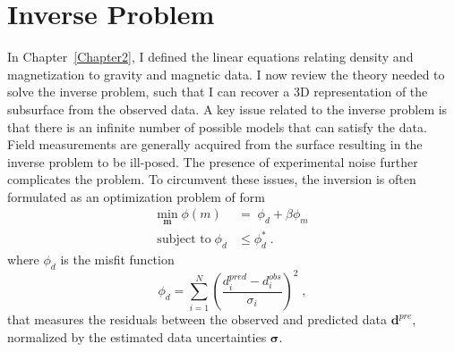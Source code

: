 \graphicspath{{./../../Figures/}}
\chapter{Inverse Problem}
\label{Chapter3}
In Chapter~\ref{Chapter2}, I defined the linear equations relating density and magnetization to gravity and magnetic data. I now review the theory needed to solve the inverse problem, such that I can recover a 3D representation of the subsurface from the observed data.
A key issue related to the inverse problem is that there is an infinite number of
possible models that can satisfy the data. Field measurements are generally acquired from the surface resulting in the inverse problem to be ill-posed. The presence of experimental noise further complicates the problem.
To circumvent these issues, the inversion is often formulated as an optimization problem of form
\begin{equation}
\begin{split}\label{GenMinProb}
\underset{\mathbf{m}}{\text{min}}\; \phi(m) & = \; \phi_d + \beta \phi_m \\
\text{subject to} \; \phi_d & \leq \phi_d^* \; .
\end{split}
\end{equation}
where $\phi_d$ is the misfit function
\begin{equation}\label{eq:misfit}
\phi_d =\sum_{i=1}^{N}\left(\frac{d_i^{pred} - {d}_i^{obs}}{\sigma_i}\right)^2 \;,
\end{equation}
that measures the residuals between the observed and predicted data $\mathbf{d}^{pre}$, normalized by the estimated data uncertainties $\boldsymbol{\sigma}$.

